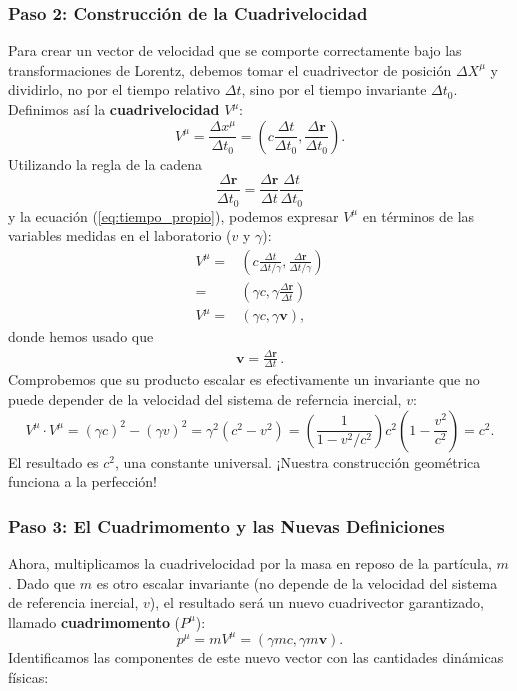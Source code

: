 \documentclass[11pt,a4paper]{book}
\begin{document}
\subsubsection{Paso 2: Construcción de la Cuadrivelocidad}

Para crear un vector de velocidad que se comporte correctamente bajo las transformaciones de Lorentz, debemos tomar el cuadrivector de posición $\Delta X^\mu$ y dividirlo, no por el tiempo relativo $\Delta t$, sino por el tiempo invariante $\Delta t_0$. Definimos así la \textbf{cuadrivelocidad} $V^\mu$:
\begin{equation}
    V^\mu = \frac{\Delta x^\mu}{\Delta t_0} = \left( c\frac{\Delta t}{\Delta t_0}, \frac{\Delta \boldsymbol{r}}{\Delta t_0} \right).
\end{equation}
Utilizando la regla de la cadena 
$$\frac{\Delta \boldsymbol{r}}{\Delta t_0} = \frac{\Delta \boldsymbol{r}}{\Delta t} \frac{\Delta t}{\Delta t_0}$$
y la ecuación (\ref{eq:tiempo_propio}), podemos expresar $V^\mu$ en términos de las variables medidas en el laboratorio ($v$ y $\gamma$):
\begin{align}
    V^\mu =& \left(c\frac{\Delta t}{\Delta t/\gamma},
    \frac{\Delta \boldsymbol{r}}{\Delta t/\gamma}
    \right)\nonumber\\
    =& \left(\gamma c,
    \gamma\frac{\Delta \boldsymbol{r}}{\Delta t}
    \right)\nonumber\\
    V^\mu =& ( \gamma c, \gamma \boldsymbol{v} ),
\end{align}
donde hemos usado que
\begin{align*}
\boldsymbol{v} = \frac{\Delta \boldsymbol{r}}{\Delta t}\,.
\end{align*}
Comprobemos que su producto escalar es efectivamente un invariante que no puede depender de la velocidad del sistema de referncia inercial, $v$:
\begin{equation}
    V^\mu \cdot V^\mu = (\gamma c)^2 - (\gamma v)^2 = \gamma^2 (c^2 - v^2) = \left( \frac{1}{1 - v^2/c^2} \right) c^2 \left( 1 - \frac{v^2}{c^2} \right) = c^2.
\end{equation}
El resultado es $c^2$, una constante universal. ¡Nuestra construcción geométrica funciona a la perfección!

\subsubsection{Paso 3: El Cuadrimomento y las Nuevas Definiciones}

Ahora, multiplicamos la cuadrivelocidad por la masa en reposo de la partícula, $m$. Dado que $m$ es otro escalar invariante (no depende de la velocidad del sistema de referencia inercial, $v$), el resultado será un nuevo cuadrivector garantizado, llamado \textbf{cuadrimomento} ($P^\mu$):
\begin{equation}
    p^\mu = m V^\mu = ( \gamma m c, \gamma m \boldsymbol{v} ).
\end{equation}
Identificamos las componentes de este nuevo vector con las cantidades dinámicas físicas:
\end{document}

